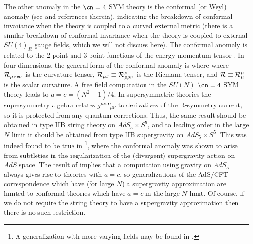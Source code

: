 The other anomaly in the $\cn=4$ SYM theory is the conformal (or Weyl)
anomaly (see \cite{Deser:1993yx,Duff:1994wm} 
and references therein), indicating the breakdown of
conformal invariance when the theory is coupled to a curved external
metric (there is a similar breakdown of conformal invariance when the
theory is coupled to external $SU(4)_R$ gauge fields, which we will
not discuss here). The conformal anomaly is related to the 2-point and
3-point functions of the energy-momentum tensor 
\cite{Osborn:1994cr,Anselmi:1997mq,Erdmenger:1997yc,Anselmi:1997am}.  
In four dimensions, the general form of the conformal anomaly is
where
where ${\cal R}_{\mu \nu \rho \sigma}$ is the curvature tensor, 
${\cal R}_{\mu \nu}
\equiv {\cal R}_{\mu \rho \nu}^{\rho}$ is the Riemann tensor, and 
${\cal R} \equiv
{\cal R}^{\mu}_{\mu}$ is the scalar curvature.
A free field computation in the $SU(N)$ $\cn=4$ SYM theory leads to
$a=c=(N^2-1)/4$. In supersymmetric theories the supersymmetry algebra
relates $g^{\mu \nu}T_{\mu \nu}$ 
to derivatives of the R-symmetry current, so it is
protected from any quantum corrections. Thus, the same result should
be obtained in type IIB string theory on $AdS_5\times S^5$, 
and to leading order in the
large $N$ limit it should be obtained
from type IIB supergravity on $AdS_5\times S^5$. This
was indeed found to be true in
\cite{Henningson:1998gx,Henningson:1998ey,Balasubramanian:1999re,
Mueck:1999nf}\footnote{A generalization with more varying fields may be found
in \cite{Nojiri:1998dh}.}, 
where the conformal anomaly was
shown to arise from subtleties in the regularization of the
(divergent) supergravity action on $AdS$ space. The result of 
\cite{Henningson:1998gx,Henningson:1998ey,Balasubramanian:1999re,Mueck:1999nf}
implies that a computation using 
gravity on $AdS_5$ always gives rise to theories
with $a=c$, so generalizations of the AdS/CFT correspondence which
have (for large $N$) a supergravity approximation
are limited to conformal theories which have $a=c$ in the large
$N$ limit. Of course, if we do not require the string theory to have a
supergravity approximation then there is no such restriction.

